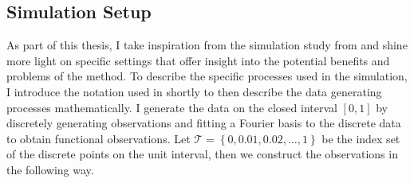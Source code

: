 \documentclass[12pt, a4paper]{article}
\theoremstyle{MAstyle} \newtheorem{assumption}{Assumption}[section]
\theoremstyle{MAstyle} \newtheorem{definition}{Definition}[section]
\theoremstyle{MAstyle} \newtheorem{theorem}{Theorem}[section]
\begin{document}
		\subsection{Simulation Setup}
		As part of this thesis, I take inspiration from the simulation study from \cite{bugni_permutation_2021} and shine more light on specific settings that offer insight into the potential benefits and problems of the method. To describe the specific processes used in the simulation, I introduce the notation used in \cite{bugni_permutation_2021} shortly to then describe the data generating processes mathematically. I generate the data on the closed interval $\left[0,1\right]$ by discretely generating observations and fitting a Fourier basis to the discrete data to obtain functional observations. Let $\mathcal{T} = \left\{0, 0.01, 0.02, \dots, 1\right\}$ be the index set of the discrete points on the unit interval, then we construct the observations in the following way.
		
\end{document}
